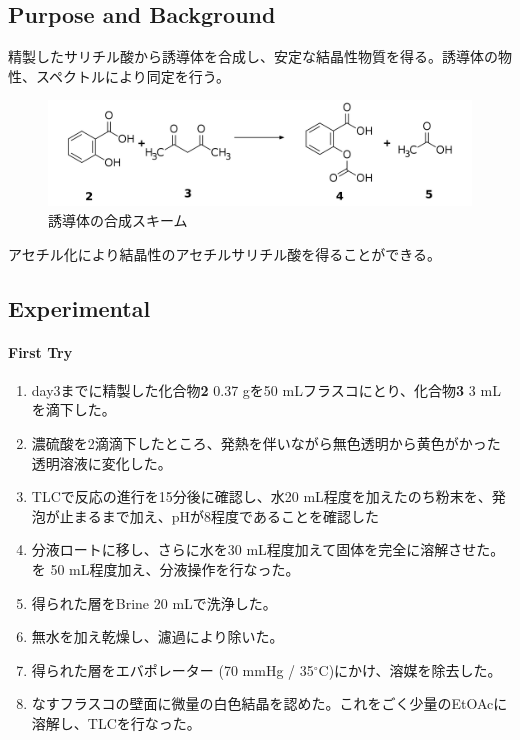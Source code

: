 \documentclass{ltjsarticle}
\theoremstyle{definition}
\numberwithin{equation}{section}
\newcommand{\D}{^\circ\text{C}}
\begin{document}
\subsection{Purpose and Background}
精製したサリチル酸から誘導体を合成し、安定な結晶性物質を得る。誘導体の物性、スペクトルにより同定を行う。
\begin{figure}[htbp]
\begin{center}
\includegraphics[width = 15 cm]{reaction5-1.png}
\caption{誘導体の合成スキーム}
\label{scheme5-1}
\end{center}
\end{figure}

アセチル化により結晶性のアセチルサリチル酸を得ることができる\cite{Zhong}。


\subsection{Experimental}
\paragraph{First Try}
\begin{enumerate}
\item day3までに精製した化合物\textbf{2} 0.37 gを50 mLフラスコにとり、化合物\textbf{3} 3 mLを滴下した。
\item 濃硫酸を2滴滴下したところ、発熱を伴いながら無色透明から黄色がかった透明溶液に変化した。
\item TLCで反応の進行を15分後に確認し、水20 mL程度を加えたのち粉末を、発泡が止まるまで加え、pHが8程度であることを確認した
\item 分液ロートに移し、さらに水を30 mL程度加えて固体を完全に溶解させた。を 50 mL程度加え、分液操作を行なった。
\item 得られた層をBrine 20 mLで洗浄した。
\item 無水を加え乾燥し、濾過により除いた。
\item 得られた層をエバポレーター (70 mmHg / 35$\D$)にかけ、溶媒を除去した。
\item なすフラスコの壁面に微量の白色結晶を認めた。これをごく少量のEtOAcに溶解し、TLCを行なった。
\end{enumerate}
\end{document}
